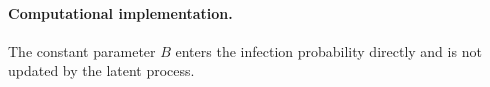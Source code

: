 

\paragraph{Computational implementation.}
The constant parameter \(B\) enters the infection probability directly and is
not updated by the latent process.


